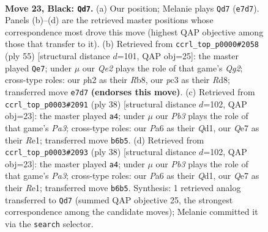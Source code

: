 \documentclass[11pt]{article}
\begin{document}
\begin{figure}[p]\centering
\begin{subfigure}{0.46\textwidth}\centering
\resizebox{\linewidth}{!}{%
\newchessgame
\chessboard[
  setfen={r1b1rk2/4q2p/ppn1pPp1/2p5/P2p1Q2/2P5/1P3PPP/1KN1RBNR b - - 0 23},
  showmover=false,
  pgfstyle=straightmove, color=movearrow, markmove={e7-d7}
]}
\caption{}
\end{subfigure}\hfill
\begin{subfigure}{0.46\textwidth}\centering
\resizebox{\linewidth}{!}{%
\newchessgame
\chessboard[
  setfen={1r1r1b1k/pbn3qp/1pp2p2/5ppN/PPQPP3/7R/4NPBP/4R1K1 b - - 3 28},
  showmover=false,
  pgfstyle=straightmove, color=movearrow, markmove={g7-e7}
]}
\caption{}
\end{subfigure}
\\[4pt]
\begin{subfigure}{0.46\textwidth}\centering
\resizebox{\linewidth}{!}{%
\newchessgame
\chessboard[
  setfen={1n2rbk1/1r3p2/p2p1qpp/1pp5/3PP3/P4N1P/1PB2PP1/R2QR1K1 w - - 0 20},
  showmover=false,
  pgfstyle=straightmove, color=movearrow, markmove={a3-a4}
]}
\caption{}
\end{subfigure}\hfill
\begin{subfigure}{0.46\textwidth}\centering
\resizebox{\linewidth}{!}{%
\newchessgame
\chessboard[
  setfen={1n2rbk1/1r3p2/p2p1qpp/1pp5/3PP3/P4N1P/1PB2PP1/R2QR1K1 w - - 0 20},
  showmover=false,
  pgfstyle=straightmove, color=movearrow, markmove={a3-a4}
]}
\caption{}
\end{subfigure}
\caption{\textbf{Move 23, Black: \texttt{Qd7}.} (a) Our position; Melanie plays \texttt{Qd7} (\texttt{e7d7}). Panels (b)--(d) are the retrieved master positions whose correspondence most drove this move (highest QAP objective among those that transfer to it). (b) Retrieved from \texttt{ccrl\_top\_p0000\#2058} (ply 55) [structural distance $d$=101, QAP obj=25]: the master played \texttt{Qe7}; under $\mu$ our \emph{Qe2} plays the role of that game's \emph{Qg2}; cross-type roles: our \emph{p}h2 as their \emph{R}b8, our \emph{p}c3 as their \emph{R}d8; transferred move \texttt{e7d7} \textbf{(endorses this move)}. (c) Retrieved from \texttt{ccrl\_top\_p0003\#2091} (ply 38) [structural distance $d$=102, QAP obj=23]: the master played \texttt{a4}; under $\mu$ our \emph{Pb3} plays the role of that game's \emph{Pa3}; cross-type roles: our \emph{P}a6 as their \emph{Q}d1, our \emph{Q}e7 as their \emph{R}e1; transferred move \texttt{b6b5}. (d) Retrieved from \texttt{ccrl\_top\_p0003\#2093} (ply 38) [structural distance $d$=102, QAP obj=23]: the master played \texttt{a4}; under $\mu$ our \emph{Pb3} plays the role of that game's \emph{Pa3}; cross-type roles: our \emph{P}a6 as their \emph{Q}d1, our \emph{Q}e7 as their \emph{R}e1; transferred move \texttt{b6b5}. Synthesis: 1 retrieved analog transferred to \texttt{Qd7} (summed QAP objective 25, the strongest correspondence among the candidate moves); Melanie committed it via the \texttt{search} selector.}
\label{fig:thought-m45}
\end{figure}
\end{document}
